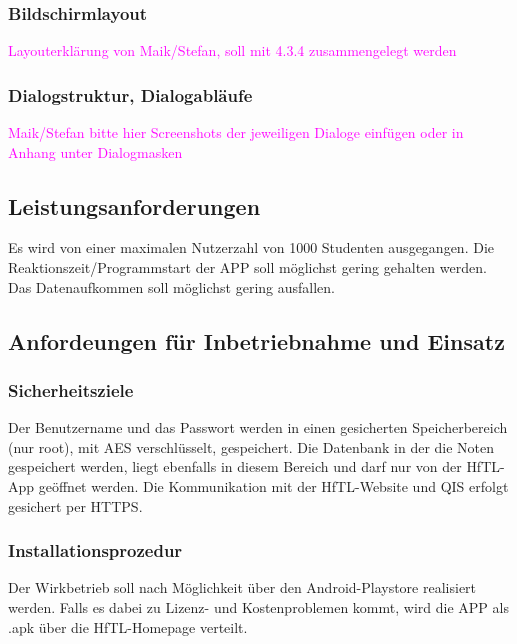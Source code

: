 \subsubsection{Bildschirmlayout}
\textcolor{magenta}{Layouterklärung von Maik/Stefan, soll mit 4.3.4 zusammengelegt werden}





\subsubsection{Dialogstruktur, Dialogabläufe}
\textcolor{magenta}{Maik/Stefan bitte hier Screenshots der jeweiligen Dialoge einfügen oder in Anhang unter Dialogmasken}





\subsection{\textbf{Leistungsanforderungen}}
Es wird von einer maximalen Nutzerzahl von 1000 Studenten ausgegangen.
Die Reaktionszeit/Programmstart der APP soll möglichst gering gehalten werden.
Das Datenaufkommen soll möglichst gering ausfallen.


\subsection{\textbf{Anfordeungen für Inbetriebnahme und Einsatz}}

\subsubsection{Sicherheitsziele}
Der Benutzername und das Passwort werden in einen gesicherten Speicherbereich (nur root), mit \acs{AES} verschlüsselt, gespeichert.
Die Datenbank in der die Noten gespeichert werden, liegt ebenfalls in diesem Bereich und darf nur von der \acs{HfTL}-App geöffnet werden.
Die Kommunikation mit der \acs{HfTL}-Website und \acs{QIS} erfolgt gesichert per \acs{HTTPS}.



\subsubsection{Installationsprozedur}

Der Wirkbetrieb soll nach Möglichkeit über den Android-Playstore realisiert werden. Falls es dabei zu Lizenz- und Kostenproblemen kommt, wird die APP als \ac{.apk} über die HfTL-Homepage verteilt.



